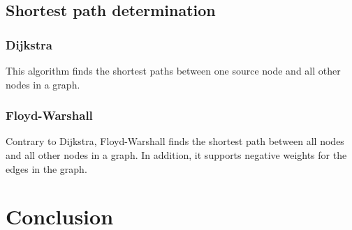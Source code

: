 \documentclass{article}
\begin{document}
\newpage

\subsection{Shortest path determination}
\subsubsection{Dijkstra}
This algorithm finds the shortest paths between one source node and all other nodes in a graph.

\subsubsection{Floyd-Warshall}
Contrary to Dijkstra, Floyd-Warshall finds the shortest path between all nodes and all other nodes in a graph.
In addition, it supports negative weights for the edges in the graph.

\newpage

\section{Conclusion}
\end{document}

